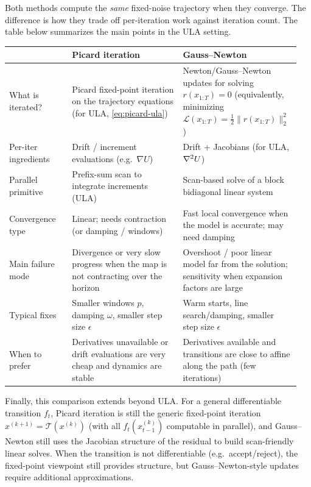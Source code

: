 \documentclass[11pt]{article}
\begin{document}
Both methods compute the \emph{same} fixed-noise trajectory when they converge.
The difference is how they trade off per-iteration work against iteration count.
The table below summarizes the main points in the ULA setting.

\begin{center}
\small
\setlength{\tabcolsep}{4pt}
\renewcommand{\arraystretch}{1.25}
\begin{tabular}{@{}p{0.21\linewidth} p{0.37\linewidth} p{0.37\linewidth}@{}}
\toprule
& \textbf{Picard iteration} & \textbf{Gauss--Newton} \\
\midrule
What is iterated?
& Picard fixed-point iteration on the trajectory equations (for ULA, \eqref{eq:picard-ula})
& Newton/Gauss--Newton updates for solving $r(x_{1:T})=0$ (equivalently, minimizing $\mathcal{L}(x_{1:T})=\tfrac12\|r(x_{1:T})\|_2^2$) \\
Per-iter ingredients
& Drift / increment evaluations (e.g.\ $\nabla U$)
& Drift + Jacobians (for ULA, $\nabla^2 U$) \\
Parallel primitive
& Prefix-sum scan to integrate increments (ULA)
& Scan-based solve of a block bidiagonal linear system \\
Convergence type
& Linear; needs contraction (or damping / windows)
& Fast local convergence when the model is accurate; may need damping \\
Main failure mode
& Divergence or very slow progress when the map is not contracting over the horizon
& Overshoot / poor linear model far from the solution; sensitivity when expansion factors are large \\
Typical fixes
& Smaller windows $p$, damping $\omega$, smaller step size $\epsilon$
& Warm starts, line search/damping, smaller step size $\epsilon$ \\
When to prefer
& Derivatives unavailable or drift evaluations are very cheap and dynamics are stable
& Derivatives available and transitions are close to affine along the path (few iterations) \\
\bottomrule
\end{tabular}
\end{center}

Finally, this comparison extends beyond ULA.
For a general differentiable transition $f_t$, Picard iteration is still the generic fixed-point iteration $x^{(k+1)}=\mathcal{T}(x^{(k)})$ (with all $f_t(x_{t-1}^{(k)})$ computable in parallel),
and Gauss--Newton still uses the Jacobian structure of the residual to build scan-friendly linear solves.
When the transition is not differentiable (e.g.\ accept/reject), the fixed-point viewpoint still provides structure, but Gauss--Newton-style updates require additional approximations.
\end{document}
